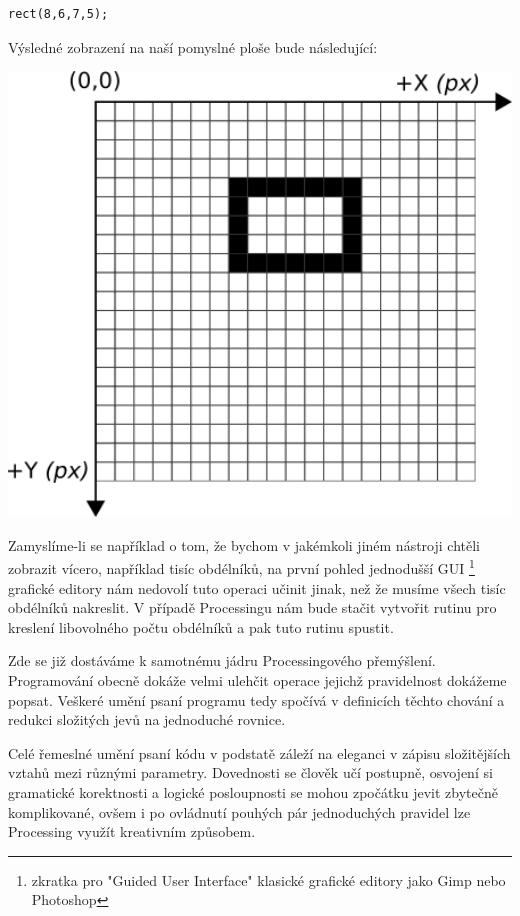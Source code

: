 \documentclass[10pt,twopage]{book}
\begin{document}
\begin{lstlisting}
rect(8,6,7,5);
\end{lstlisting}

Výsledné zobrazení na naší pomyslné ploše bude následující:

\begin{center}
\includegraphics[width = 1\textwidth]{imgs/gridRect2d.png}
\end{center}


Zamyslíme-li se například o tom, že bychom v jakémkoli jiném nástroji chtěli zobrazit vícero, například tisíc obdélníků, na první pohled jednodušší GUI \footnote{zkratka pro "Guided User Interface" klasické grafické editory jako Gimp nebo Photoshop} grafické editory nám nedovolí tuto operaci učinit jinak, než že musíme všech tisíc obdélníků nakreslit. V případě Processingu nám bude stačit vytvořit rutinu pro kreslení libovolného počtu obdélníků a pak tuto rutinu spustit.

Zde se již dostáváme k samotnému jádru Processingového přemýšlení. Programování obecně dokáže velmi ulehčit operace jejichž pravidelnost dokážeme popsat. Veškeré umění psaní programu tedy spočívá v definicích těchto chování a redukci složitých jevů na jednoduché rovnice.

Celé řemeslné umění psaní kódu v podstatě záleží na eleganci v zápisu složitějších vztahů mezi různými parametry. Dovednosti se člověk učí postupně, osvojení si gramatické korektnosti a logické posloupnosti se mohou zpočátku jevit zbytečně komplikované, ovšem i po ovládnutí pouhých pár jednoduchých pravidel lze Processing využít kreativním způsobem.
\end{document}
